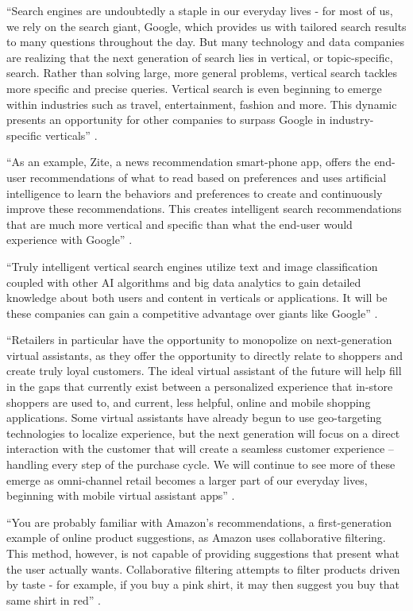``Search engines are undoubtedly a staple in our everyday lives - for most of us, we rely on the search giant, Google, which provides us with tailored search results to many questions throughout the day. But many technology and data companies are realizing that the next generation of search lies in vertical, or topic-specific, search. Rather than solving large, more general problems, vertical search tackles more specific and precise queries. Vertical search is even beginning to emerge within industries such as travel, entertainment, fashion and more. This dynamic presents an opportunity for other companies to surpass Google in industry-specific verticals'' \cite{Hard2014applications}.

``As an example, Zite, a news recommendation smart-phone app, offers the end-user recommendations of what to read based on preferences and uses artificial intelligence to learn the behaviors and preferences to create and continuously improve these recommendations. This creates intelligent search recommendations that are much more vertical and specific than what the end-user would experience with Google'' \cite{Hard2014applications}.

``Truly intelligent vertical search engines utilize text and image classification coupled with other AI algorithms and big data analytics to gain detailed knowledge about both users and content in verticals or applications. It will be these companies can gain a competitive advantage over giants like Google'' \cite{Hard2014applications}.

``Retailers in particular have the opportunity to monopolize on next-generation virtual assistants, as they offer the opportunity to directly relate to shoppers and create truly loyal customers. The ideal virtual assistant of the future will help fill in the gaps that currently exist between a personalized experience that in-store shoppers are used to, and current, less helpful, online and mobile shopping applications. Some virtual assistants have already begun to use geo-targeting technologies to localize experience, but the next generation will focus on a direct interaction with the customer that will create a seamless customer experience – handling every step of the purchase cycle. We will continue to see more of these emerge as omni-channel retail becomes a larger part of our everyday lives, beginning with mobile virtual assistant apps'' \cite{Hard2014applications}.

``You are probably familiar with Amazon’s recommendations, a first-generation example of online product suggestions, as Amazon uses collaborative filtering. This method, however, is not capable of providing suggestions that present what the user actually wants. Collaborative filtering attempts to filter products driven by taste - for example, if you buy a pink shirt, it may then suggest you buy that same shirt in red'' \cite{Hard2014applications}.

